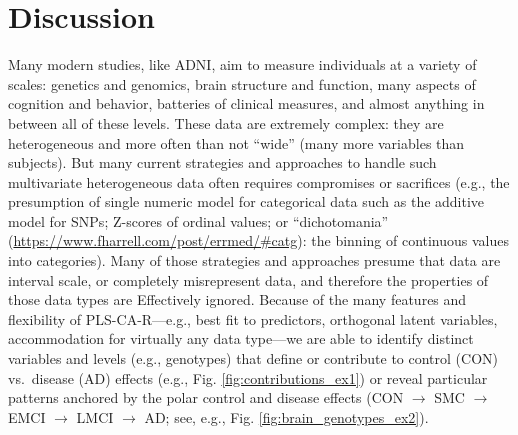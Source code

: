 \documentclass[12pt]{article}
\begin{document}
\hypertarget{discussion}{%
\section{Discussion}\label{discussion}}

\label{section:Disc}

Many modern studies, like ADNI, aim to measure individuals at a variety
of scales: genetics and genomics, brain structure and function, many
aspects of cognition and behavior, batteries of clinical measures, and
almost anything in between all of these levels. These data are extremely
complex: they are heterogeneous and more often than not ``wide'' (many
more variables than subjects). But many current strategies and
approaches to handle such multivariate heterogeneous data often requires
compromises or sacrifices (e.g., the presumption of single numeric model
for categorical data such as the additive model for SNPs; Z-scores of
ordinal values; or ``dichotomania''
(\url{https://www.fharrell.com/post/errmed/\#catg}): the binning of
continuous values into categories). Many of those strategies and
approaches presume that data are interval scale, or completely
misrepresent data, and therefore the properties of those data types are
Effectively ignored. Because of the many features and flexibility of
PLS-CA-R---e.g., best fit to predictors, orthogonal latent variables,
accommodation for virtually any data type---we are able to identify
distinct variables and levels (e.g., genotypes) that define or
contribute to control (CON) vs.~disease (AD) effects (e.g., Fig.
\ref{fig:contributions_ex1}) or reveal particular patterns anchored by
the polar control and disease effects (CON \(\rightarrow\) SMC
\(\rightarrow\) EMCI \(\rightarrow\) LMCI \(\rightarrow\) AD; see, e.g.,
Fig. \ref{fig:brain_genotypes_ex2}).
\end{document}
